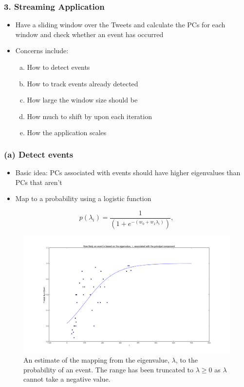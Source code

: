 \documentclass{beamer}
\begin{document}
\begin{frame}
\frametitle{3. Streaming Application}
\begin{itemize}
\item Have a sliding window over the Tweets and calculate the PCs for each window and check whether an event has occurred
\item Concerns include:
\begin{enumerate}[(a)]
\item How to detect events
\item How to track events already detected
\item How large the window size should be
\item How much to shift by upon each iteration 
\item How the application scales
\end{enumerate}
\end{itemize}

\end{frame}

\begin{frame}
\frametitle{(a) Detect events}
\begin{itemize}
\item Basic idea: PCs associated with events should have higher eigenvalues than PCs that aren't
\item Map to a probability using a logistic function
\end{itemize}
\begin{equation}
p(\lambda_i)= \frac{1}{\left( 1 + e^{-(w_0 + w_1\lambda_i)}\right)},
\label{logit}
\end{equation}

\begin{figure}[H]
\centering
\includegraphics[scale=0.17]{Lambda_scatter.png}
\caption{An estimate of the mapping from the eigenvalue, $\lambda$, to the probability of an event. The range has been truncated to $\lambda \geq 0$ as $\lambda$ cannot take a negative value.}
\label{lambda_scatter}
\end{figure}
\end{frame}
\end{document}
